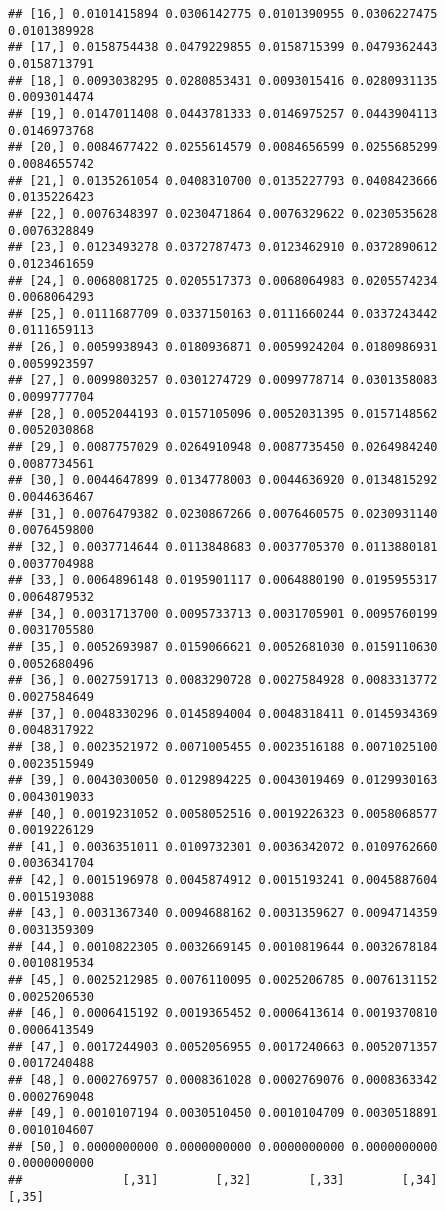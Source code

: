 \documentclass[]{article}
\begin{document}
\begin{verbatim}
## [16,] 0.0101415894 0.0306142775 0.0101390955 0.0306227475 0.0101389928
## [17,] 0.0158754438 0.0479229855 0.0158715399 0.0479362443 0.0158713791
## [18,] 0.0093038295 0.0280853431 0.0093015416 0.0280931135 0.0093014474
## [19,] 0.0147011408 0.0443781333 0.0146975257 0.0443904113 0.0146973768
## [20,] 0.0084677422 0.0255614579 0.0084656599 0.0255685299 0.0084655742
## [21,] 0.0135261054 0.0408310700 0.0135227793 0.0408423666 0.0135226423
## [22,] 0.0076348397 0.0230471864 0.0076329622 0.0230535628 0.0076328849
## [23,] 0.0123493278 0.0372787473 0.0123462910 0.0372890612 0.0123461659
## [24,] 0.0068081725 0.0205517373 0.0068064983 0.0205574234 0.0068064293
## [25,] 0.0111687709 0.0337150163 0.0111660244 0.0337243442 0.0111659113
## [26,] 0.0059938943 0.0180936871 0.0059924204 0.0180986931 0.0059923597
## [27,] 0.0099803257 0.0301274729 0.0099778714 0.0301358083 0.0099777704
## [28,] 0.0052044193 0.0157105096 0.0052031395 0.0157148562 0.0052030868
## [29,] 0.0087757029 0.0264910948 0.0087735450 0.0264984240 0.0087734561
## [30,] 0.0044647899 0.0134778003 0.0044636920 0.0134815292 0.0044636467
## [31,] 0.0076479382 0.0230867266 0.0076460575 0.0230931140 0.0076459800
## [32,] 0.0037714644 0.0113848683 0.0037705370 0.0113880181 0.0037704988
## [33,] 0.0064896148 0.0195901117 0.0064880190 0.0195955317 0.0064879532
## [34,] 0.0031713700 0.0095733713 0.0031705901 0.0095760199 0.0031705580
## [35,] 0.0052693987 0.0159066621 0.0052681030 0.0159110630 0.0052680496
## [36,] 0.0027591713 0.0083290728 0.0027584928 0.0083313772 0.0027584649
## [37,] 0.0048330296 0.0145894004 0.0048318411 0.0145934369 0.0048317922
## [38,] 0.0023521972 0.0071005455 0.0023516188 0.0071025100 0.0023515949
## [39,] 0.0043030050 0.0129894225 0.0043019469 0.0129930163 0.0043019033
## [40,] 0.0019231052 0.0058052516 0.0019226323 0.0058068577 0.0019226129
## [41,] 0.0036351011 0.0109732301 0.0036342072 0.0109762660 0.0036341704
## [42,] 0.0015196978 0.0045874912 0.0015193241 0.0045887604 0.0015193088
## [43,] 0.0031367340 0.0094688162 0.0031359627 0.0094714359 0.0031359309
## [44,] 0.0010822305 0.0032669145 0.0010819644 0.0032678184 0.0010819534
## [45,] 0.0025212985 0.0076110095 0.0025206785 0.0076131152 0.0025206530
## [46,] 0.0006415192 0.0019365452 0.0006413614 0.0019370810 0.0006413549
## [47,] 0.0017244903 0.0052056955 0.0017240663 0.0052071357 0.0017240488
## [48,] 0.0002769757 0.0008361028 0.0002769076 0.0008363342 0.0002769048
## [49,] 0.0010107194 0.0030510450 0.0010104709 0.0030518891 0.0010104607
## [50,] 0.0000000000 0.0000000000 0.0000000000 0.0000000000 0.0000000000
##              [,31]        [,32]        [,33]        [,34]        [,35]

\end{verbatim}
\end{document}
